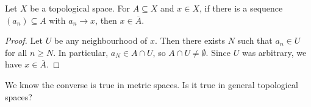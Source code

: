 \begin{proposition}
   Let $X$ be a topological space. For $A\subseteq X$ and $x\in X$, if there is a sequence $(a_n)\subseteq A$ with $a_n\to x$, then $x\in\overline{A}$.
\end{proposition}
\begin{proof}
    Let $U$ be any neighbourhood of $x$. Then there exists $N$ such that $a_n\in U$ for all $n\ge N$. In particular, $a_N\in A\cap U$, so $A\cap U\neq \emptyset$. Since $U$ was arbitrary, we have $x\in\overline{A}$.
\end{proof}

We know the converse is true in metric spaces. Is it true in general topological spaces?







